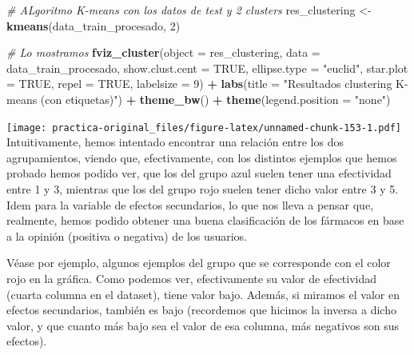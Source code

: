 \documentclass[spanish,]{article}
\newenvironment{Shaded}{\begin{snugshade}}{\end{snugshade}}
\newcommand{\KeywordTok}[1]{\textcolor[rgb]{0.13,0.29,0.53}{\textbf{#1}}}
\newcommand{\DataTypeTok}[1]{\textcolor[rgb]{0.13,0.29,0.53}{#1}}
\newcommand{\DecValTok}[1]{\textcolor[rgb]{0.00,0.00,0.81}{#1}}
\newcommand{\StringTok}[1]{\textcolor[rgb]{0.31,0.60,0.02}{#1}}
\newcommand{\CommentTok}[1]{\textcolor[rgb]{0.56,0.35,0.01}{\textit{#1}}}
\newcommand{\OtherTok}[1]{\textcolor[rgb]{0.56,0.35,0.01}{#1}}
\newcommand{\OperatorTok}[1]{\textcolor[rgb]{0.81,0.36,0.00}{\textbf{#1}}}
\newcommand{\NormalTok}[1]{#1}
\begin{document}
\begin{Shaded}
\begin{Highlighting}[]
\CommentTok{# ALgoritmo K-means con los datos de test y 2 clusters}
\NormalTok{res_clustering <-}\StringTok{ }\KeywordTok{kmeans}\NormalTok{(data_train_procesado, }\DecValTok{2}\NormalTok{)}

\CommentTok{# Lo mostramos}
\KeywordTok{fviz_cluster}\NormalTok{(}\DataTypeTok{object =}\NormalTok{ res_clustering, }\DataTypeTok{data =}\NormalTok{ data_train_procesado, }\DataTypeTok{show.clust.cent =} \OtherTok{TRUE}\NormalTok{,}
             \DataTypeTok{ellipse.type =} \StringTok{"euclid"}\NormalTok{, }\DataTypeTok{star.plot =} \OtherTok{TRUE}\NormalTok{, }\DataTypeTok{repel =} \OtherTok{TRUE}\NormalTok{, }\DataTypeTok{labelsize =} \DecValTok{9}\NormalTok{) }\OperatorTok{+}
\StringTok{  }\KeywordTok{labs}\NormalTok{(}\DataTypeTok{title =} \StringTok{"Resultados clustering K-means (con etiquetas)"}\NormalTok{) }\OperatorTok{+}
\StringTok{  }\KeywordTok{theme_bw}\NormalTok{() }\OperatorTok{+}
\StringTok{  }\KeywordTok{theme}\NormalTok{(}\DataTypeTok{legend.position =} \StringTok{"none"}\NormalTok{)}
\end{Highlighting}
\end{Shaded}

\texttt{[image: practica-original\_files/figure-latex/unnamed-chunk-153-1.pdf]}
Intuitivamente, hemos intentado encontrar una relación entre los dos
agrupamientos, viendo que, efectivamente, con los distintos ejemplos que
hemos probado hemos podido ver, que los del grupo azul suelen tener una
efectividad entre 1 y 3, mientras que los del grupo rojo suelen tener
dicho valor entre 3 y 5. Idem para la variable de efectos secundarios,
lo que nos lleva a pensar que, realmente, hemos podido obtener una buena
clasificación de los fármacos en base a la opinión (positiva o negativa)
de los usuarios.

Véase por ejemplo, algunos ejemplos del grupo que se corresponde con el
color rojo en la gráfica. Como podemos ver, efectivamente su valor de
efectividad (cuarta columna en el dataset), tiene valor bajo. Además, si
miramos el valor en efectos secundarios, también es bajo (recordemos que
hicimos la inversa a dicho valor, y que cuanto más bajo sea el valor de
esa columna, más negativos son sus efectos).
\end{document}
